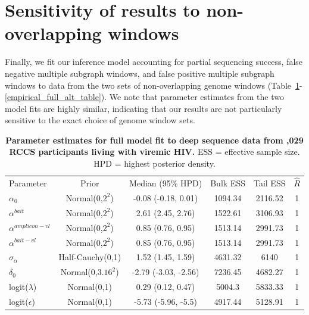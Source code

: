 \documentclass[10pt,letterpaper]{article}
\newlength\savedwidth
\newcommand\thickhline{\noalign{\global\savedwidth\arrayrulewidth\global\arrayrulewidth 2pt}%
\hline
\noalign{\global\arrayrulewidth\savedwidth}}
\begin{document}
\section{Sensitivity of results to non-overlapping windows}
Finally, we fit our inference model accounting for partial sequencing success, false negative multiple subgraph windows, and false positive multiple subgraph windows to data from the two sets of non-overlapping genome windows (Table~\ref{empirical_full_table}-\ref{empirical_full_alt_table}). We note that parameter estimates from the two model fits are highly similar, indicating that our results are not particularly sensitive to the exact choice of genome window sets. 


\begin{table}[hbp!]
\centering
\begin{tabular}[t]{|l|c|c|c|c|c|}
\hline
Parameter & Prior & Median (95\% HPD) & Bulk ESS & Tail ESS & $\hat{R}$ \\ \thickhline
$\alpha_0$ & Normal(0,$2^2$) & 
  -0.08 
    (-0.18, 0.01) & 
  1094.34 & 
  2116.52 & 
  1 \\ \hline
  $\alpha^{bait}$ & Normal(0,$2^2$) & 
  2.61
    (2.45, 2.76) & 
  1522.61 & 
  3106.93 & 
  1 \\ \hline
  $\alpha^{amplicon-vl}$ & Normal(0,$2^2$) & 
  0.85
    (0.76, 0.95) & 
  1513.14 & 
  2991.73 & 
  1 \\ \hline
  $\alpha^{bait-vl}$ & Normal(0,$2^2$) & 
  0.85
    (0.76, 0.95) & 
  1513.14 & 
  2991.73 & 
  1 \\ \hline
$\sigma_\alpha$ & Half-Cauchy(0,1) & 
  1.52
    (1.45, 1.59) & 
  4631.32 & 
  6140 &
  1 \\ \hline
$\delta_0$ & Normal(0,$3.16^2$) & 
  -2.79
    (-3.03, -2.56) & 
  7236.45 & 
  4682.27 & 
  1 \\ \hline
logit($\lambda$) & Normal(0,1) & 
  0.29
    (0.12, 0.47) & 
  5004.3 & 
  5833.33 & 
  1 \\ \hline
logit($\epsilon$) & Normal(0,1) & 
  -5.73
    (-5.96, -5.5) & 
  4917.44 & 
  5128.91 & 
  1 \\ \hline
\end{tabular}
\caption{{\bf Parameter estimates for full model fit to deep sequence data from ,029 RCCS participants living with viremic HIV.} ESS = effective sample size. HPD = highest posterior density. }
\label{empirical_full_table}
\end{table}
\end{document}

